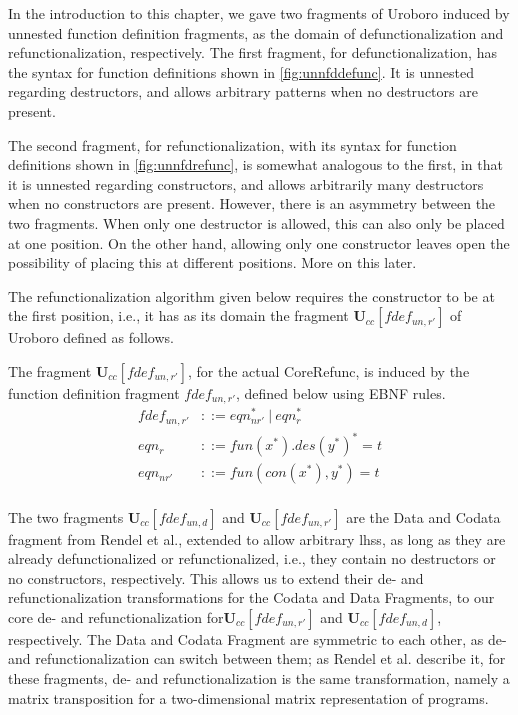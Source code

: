 In the introduction to this chapter, we gave two fragments of Uroboro induced by unnested function definition fragments, as the domain of defunctionalization and refunctionalization, respectively. The first fragment, for defunctionalization, has the syntax for function definitions shown in \autoref{fig:unnfddefunc}. It is unnested regarding destructors, and allows arbitrary patterns when no destructors are present.

The second fragment, for refunctionalization, with its syntax for function definitions shown in \autoref{fig:unnfdrefunc}, is somewhat analogous to the first, in that it is unnested regarding constructors, and allows arbitrarily many destructors when no constructors are present. However, there is an asymmetry between the two fragments. When only one destructor is allowed, this can also only be placed at one position. On the other hand, allowing only one constructor leaves open the possibility of placing this at different positions. More on this later.

The refunctionalization algorithm given below requires the constructor to be at the first position, i.e., it has as its domain the fragment $\mathbf{U}_{cc}[fdef_{un,r'}]$ of Uroboro defined as follows.

\begin{definition}
The fragment $\mathbf{U}_{cc}[fdef_{un,r'}]$, for the actual \textsf{CoreRefunc}, is induced by the function definition fragment $fdef_{un,r'}$, defined below using EBNF rules.
\begin{align*}
fdef_{un,r'} &::= eqn_{nr'}^* ~ | ~ eqn_r^* \\
eqn_r &::= fun(x^*).des(y^*)^* = t \\
eqn_{nr'} &::= fun(con(x^*), y^*) = t \\
\end{align*}
\end{definition}

The two fragments $\mathbf{U}_{cc}[fdef_{un,d}]$ and $\mathbf{U}_{cc}[fdef_{un,r'}]$ are the Data and Codata fragment from Rendel et al., extended to allow arbitrary lhss, as long as they are already defunctionalized or refunctionalized, i.e., they contain no destructors or no constructors, respectively. This allows us to extend their de- and refunctionalization transformations for the Codata and Data Fragments, to our core de- and refunctionalization for$\mathbf{U}_{cc}[fdef_{un,r'}]$ and $\mathbf{U}_{cc}[fdef_{un,d}]$, respectively. The Data and Codata Fragment are symmetric to each other, as de- and refunctionalization can switch between them; as Rendel et al.\cite{rendel15automatic} describe it, for these fragments, de- and refunctionalization is the same transformation, namely a matrix transposition for a two-dimensional matrix representation of programs.

